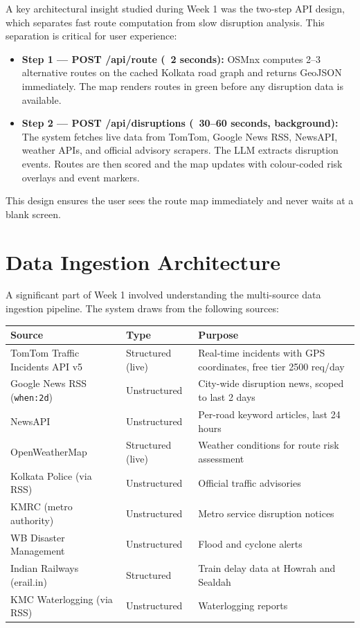 \documentclass[12pt, a4paper]{report}
\begin{document}
A key architectural insight studied during Week 1 was the two-step API design, which separates fast route computation from slow disruption analysis. This separation is critical for user experience:

\begin{itemize}
    \item \textbf{Step 1 — POST /api/route (~2 seconds):} OSMnx computes 2--3 alternative routes on the cached Kolkata road graph and returns GeoJSON immediately. The map renders routes in green before any disruption data is available.
    \item \textbf{Step 2 — POST /api/disruptions (~30--60 seconds, background):} The system fetches live data from TomTom, Google News RSS, NewsAPI, weather APIs, and official advisory scrapers. The LLM extracts disruption events. Routes are then scored and the map updates with colour-coded risk overlays and event markers.
\end{itemize}

This design ensures the user sees the route map immediately and never waits at a blank screen.

\section{Data Ingestion Architecture}

A significant part of Week 1 involved understanding the multi-source data ingestion pipeline. The system draws from the following sources:

\begin{longtable}{|p{4cm}|p{3cm}|p{5cm}|}
\hline
\textbf{Source} & \textbf{Type} & \textbf{Purpose} \\
\hline
TomTom Traffic Incidents API v5 & Structured (live) & Real-time incidents with GPS coordinates, free tier 2500 req/day \\
\hline
Google News RSS (\texttt{when:2d}) & Unstructured & City-wide disruption news, scoped to last 2 days \\
\hline
NewsAPI & Unstructured & Per-road keyword articles, last 24 hours \\
\hline
OpenWeatherMap & Structured (live) & Weather conditions for route risk assessment \\
\hline
Kolkata Police (via RSS) & Unstructured & Official traffic advisories \\
\hline
KMRC (metro authority) & Unstructured & Metro service disruption notices \\
\hline
WB Disaster Management & Unstructured & Flood and cyclone alerts \\
\hline
Indian Railways (erail.in) & Structured & Train delay data at Howrah and Sealdah \\
\hline
KMC Waterlogging (via RSS) & Unstructured & Waterlogging reports \\
\hline
\end{longtable}
\end{document}
